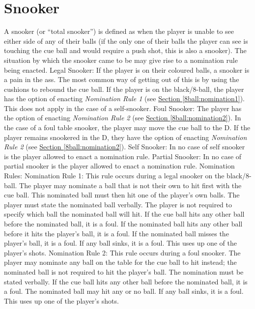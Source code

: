 \section{Snooker} \label{8ball:snooker}
 A snooker (or “total snooker”) is defined as when the player is unable to see either side of any of their balls (if the only one of their balls the player can see is touching the cue ball and would require a push shot, this is also a snooker). The situation by which the snooker came to be may give rise to a nomination rule being enacted.%
 Legal Snooker:%
\subruleitem If the player is on their coloured balls, a snooker is a pain in the ass. The most common way of getting out of this is by using the cushions to rebound the cue ball.%
\subruleitem If the player is on the black/8-ball, the player has the option of enacting \emph{Nomination Rule 1} (see \hyperref[8ball:nomination1]{Section \ref*{8ball:nomination1}}). This does not apply in the case of a self-snooker.%
 Foul Snooker:%
\subruleitem The player has the option of enacting \emph{Nomination Rule 2} (see \hyperref[8ball:nomination2]{Section \ref*{8ball:nomination2}}).%
\subruleitem In the case of a foul table snooker, the player may move the cue ball to the D. If the player remains snookered in the D, they have the option of enacting \emph{Nomination Rule 2} (see \hyperref[8ball:nomination2]{Section \ref*{8ball:nomination2}}).%
 Self Snooker: In no case of self snooker is the player allowed to enact a nomination rule.%
 Partial Snooker: In no case of partial snooker is the player allowed to enact a nomination rule.%
 Nomination Rules:%
\subruleitem\label{8ball:nomination1}Nomination Rule 1: This rule occurs during a legal snooker on the black/8-ball. The player may nominate a ball that is not their own to hit first with the cue ball. This nominated ball must then hit one of the player's own balls. The player must state the nominated ball verbally. The player is not required to specify which ball the nominated ball will hit. If the cue ball hits any other ball before the nominated ball, it is a foul. If the nominated ball hits any other ball before it hits the player's ball, it is a foul. If the nominated ball misses the player's ball, it is a foul. If any ball sinks, it is a foul. This uses up one of the player's shots.%
\subruleitem\label{8ball:nomination2}Nomination Rule 2: This rule occurs during a foul snooker. The player may nominate any ball on the table for the cue ball to hit instead; the nominated ball is not required to hit the player's ball. The nomination must be stated verbally. If the cue ball hits any other ball before the nominated ball, it is a foul. The nominated ball may hit any or no ball. If any ball sinks, it is a foul. This uses up one of the player's shots.%

